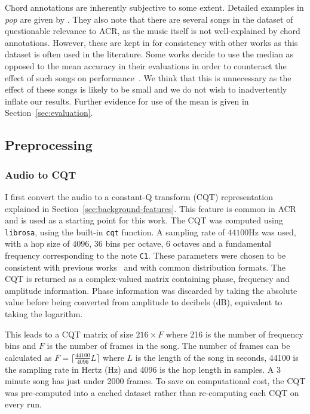 Chord annotations are inherently subjective to some extent. Detailed examples in \emph{pop} are given by \citet{FourTimelyInsights}. They also note that there are several songs in the dataset of questionable relevance to ACR, as the music itself is not well-explained by chord annotations. However, these are kept in for consistency with other works as this dataset is often used in the literature. Some works decide to use the median as opposed to the mean accuracy in their evaluations in order to counteract the effect of such songs on performance~\citep{StructuredTraining}. We think that this is unnecessary as the effect of these songs is likely to be small and we do not wish to inadvertently inflate our results. Further evidence for use of the mean is given in Section~\ref{sec:evaluation}.

\subsection{Preprocessing}

\subsubsection{Audio to CQT}\label{sec:audio-to-cqt}

I first convert the audio to a constant-Q transform (CQT) representation explained in Section~\ref{sec:background-features}. This feature is common in ACR and is used as a starting point for this work. The CQT was computed using \texttt{librosa}, using the built-in \texttt{cqt} function. A sampling rate of $44100$Hz was used, with a hop size of 4096, 36 bins per octave, 6 octaves and a fundamental frequency corresponding to the note \texttt{C1}. These parameters were chosen to be consistent with previous works~\citep{StructuredTraining} and with common distribution formats. The CQT is returned as a complex-valued matrix containing phase, frequency and amplitude information. Phase information was discarded by taking the absolute value before being converted from amplitude to decibels (dB), equivalent to taking the logarithm.

This leads to a CQT matrix of size $216 \times F$ where 216 is the number of frequency bins and $F$ is the number of frames in the song. The number of frames can be calculated as $F = \lceil \frac{44100}{4096} L  \rceil$ where $L$ is the length of the song in seconds, 44100 is the sampling rate in Hertz (Hz) and 4096 is the hop length in samples. A 3 minute song has just under 2000 frames. To save on computational cost, the CQT was pre-computed into a cached dataset rather than re-computing each CQT on every run.


